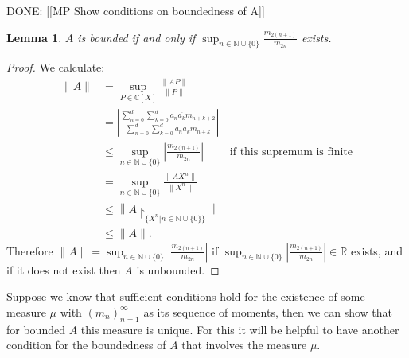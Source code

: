 \documentclass[12pt,oneside]{report}
\newtheorem{lem}[thm]{Lemma}
\begin{document}
DONE: [[MP Show conditions on boundedness of A]]
\begin{lem}\label{A-bound}
    $A$ is bounded if and only if $\sup_{n \in \mathbb{N} \cup \{ 0 \}}\frac{m_{2(n+1)}}{m_{2n}}$ exists.
\end{lem}
\begin{proof}
    We calculate:
    \begin{align*}
        \|A\| &= \sup_{P \in \mathbb{C}[X]} \frac{\|AP\|}{\|P\|} \\
        &= \left|\frac{\sum_{n=0}^{d}\sum_{k=0}^{d}a_{n}\overline{a_{k}}m_{n+k+2}}{\sum_{n=0}^{d}\sum_{k=0}^{d}a_{n}\overline{a_{k}}m_{n+k}}\right| \\
        &\leq \sup_{n \in \mathbb{N} \cup \{ 0 \}} \left|\frac{m_{2(n+1)}}{m_{2n}}\right| & \text{if this supremum is finite} \\
        &= \sup_{n \in \mathbb{N} \cup \{ 0 \}} \frac{\|AX^{n}\|}{\|X^{n}\|} \\
        &\leq \left\|A\restriction_{\{ X^{n} | n \in \mathbb{N} \cup \{ 0 \} \}}\right\| \\
        &\leq \|A\|.
    \end{align*}
    Therefore $\|A\| = \sup_{n \in \mathbb{N} \cup \{ 0 \}} \left|\frac{m_{2(n+1)}}{m_{2n}}\right|$ if $\sup_{n \in \mathbb{N} \cup \{ 0 \}} \left|\frac{m_{2(n+1)}}{m_{2n}}\right| \in \mathbb{R}$ exists, and if it does not exist then $A$ is unbounded.
\end{proof}

Suppose we know that sufficient conditions hold for the existence of some measure $\mu$ with $(m_{n})_{n=1}^{\infty}$ as its sequence of moments, then we can show that for bounded $A$ this measure is unique. For this it will be helpful to have another condition for the boundedness of $A$ that involves the measure $\mu$.
\end{document}
